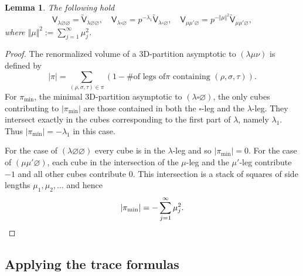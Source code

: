 \documentclass[12pt]{amsart}
\newtheorem{lemma}[theorem]{Lemma}
\theoremstyle{definition}
\newcommand{\sfV}{\mathsf{V}}
\newcommand{\sfVtilde}{\widetilde{\mathsf{V}}}
\renewcommand{\emptyset}{\varnothing}
\newcommand{\bx}{\square}
\newcommand{\SubSecSpace}{$\,$\vspace{0.2cm}\par } %
\begin{document}
\begin{lemma}\label{lem: normalized vertex in terms of usual vertex}
The following hold 
\[
\sfV_{\lambda \emptyset \emptyset} =\sfVtilde_{\lambda \emptyset
\emptyset}, \quad \sfV_{\lambda \bx \emptyset} = p^{-\lambda_{1}}
\sfVtilde_{\lambda \bx \emptyset}, \quad \sfV_{\mu \mu' \emptyset}
=p^{-\Vert \mu \Vert^{2}} \sfVtilde_{\mu \mu' \emptyset},
\]
where $\Vert \mu \Vert^{2}:= \sum_{j=1}^{\infty} \mu_{j}^{2}$.
\end{lemma}
\begin{proof}
The renormalized volume of a 3D-partition asymptotic to $(\lambda \mu
\nu )$ is defined by
\[
|\pi | = \sum_{(\rho ,\sigma ,\tau )\in \pi} (1-\text{\# of legs of
$\pi$ containing $(\rho ,\sigma ,\tau )$}) .
\]
For $\pi_{\min}$, the minimal 3D-partition asymptotic to $(\lambda \bx
\emptyset)$, the only cubes contributing to $|\pi_{\min}|$ are those
contained in both the $\bx$-leg and the $\lambda$-leg. They intersect
exactly in the cubes corresponding to the first part of $\lambda$,
namely $\lambda_{1}$. Thus $|\pi_{\min}|=-\lambda_{1}$ in this case.

For the case of $(\lambda \emptyset \emptyset )$ every cube is in the
$\lambda$-leg and so $|\pi_{\min}|=0$. For the case of $(\mu \mu'
\emptyset )$, each cube in the intersection of the $\mu$-leg and the
$\mu '$-leg contribute $-1$ and all other cubes contribute 0. This
intersection is a stack of squares of side lengths
$\mu_{1},\mu_{2},\dotsc$ and hence
\[
|\pi_{\min}| = -\sum_{j=1}^{\infty} \mu_{j}^{2}. \qedhere
\]
\end{proof}

\subsection{Applying the trace formulas}\SubSecSpace 
\end{document}
